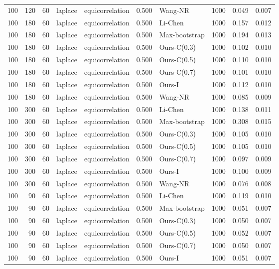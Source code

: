 \begin{tabular}{rrrllrlrrr}
100 & 120 & 60 & laplace & equicorrelation & 0.500 & Wang-NR & 1000 & 0.049 & 0.007 \\
100 & 180 & 60 & laplace & equicorrelation & 0.500 & Li-Chen & 1000 & 0.157 & 0.012 \\
100 & 180 & 60 & laplace & equicorrelation & 0.500 & Max-bootstrap & 1000 & 0.194 & 0.013 \\
100 & 180 & 60 & laplace & equicorrelation & 0.500 & Ours-C(0.3) & 1000 & 0.102 & 0.010 \\
100 & 180 & 60 & laplace & equicorrelation & 0.500 & Ours-C(0.5) & 1000 & 0.110 & 0.010 \\
100 & 180 & 60 & laplace & equicorrelation & 0.500 & Ours-C(0.7) & 1000 & 0.101 & 0.010 \\
100 & 180 & 60 & laplace & equicorrelation & 0.500 & Ours-I & 1000 & 0.112 & 0.010 \\
100 & 180 & 60 & laplace & equicorrelation & 0.500 & Wang-NR & 1000 & 0.085 & 0.009 \\
100 & 300 & 60 & laplace & equicorrelation & 0.500 & Li-Chen & 1000 & 0.138 & 0.011 \\
100 & 300 & 60 & laplace & equicorrelation & 0.500 & Max-bootstrap & 1000 & 0.308 & 0.015 \\
100 & 300 & 60 & laplace & equicorrelation & 0.500 & Ours-C(0.3) & 1000 & 0.105 & 0.010 \\
100 & 300 & 60 & laplace & equicorrelation & 0.500 & Ours-C(0.5) & 1000 & 0.105 & 0.010 \\
100 & 300 & 60 & laplace & equicorrelation & 0.500 & Ours-C(0.7) & 1000 & 0.097 & 0.009 \\
100 & 300 & 60 & laplace & equicorrelation & 0.500 & Ours-I & 1000 & 0.100 & 0.009 \\
100 & 300 & 60 & laplace & equicorrelation & 0.500 & Wang-NR & 1000 & 0.076 & 0.008 \\
100 & 90 & 60 & laplace & equicorrelation & 0.500 & Li-Chen & 1000 & 0.119 & 0.010 \\
100 & 90 & 60 & laplace & equicorrelation & 0.500 & Max-bootstrap & 1000 & 0.051 & 0.007 \\
100 & 90 & 60 & laplace & equicorrelation & 0.500 & Ours-C(0.3) & 1000 & 0.050 & 0.007 \\
100 & 90 & 60 & laplace & equicorrelation & 0.500 & Ours-C(0.5) & 1000 & 0.052 & 0.007 \\
100 & 90 & 60 & laplace & equicorrelation & 0.500 & Ours-C(0.7) & 1000 & 0.050 & 0.007 \\
100 & 90 & 60 & laplace & equicorrelation & 0.500 & Ours-I & 1000 & 0.051 & 0.007 \\

\end{tabular}
